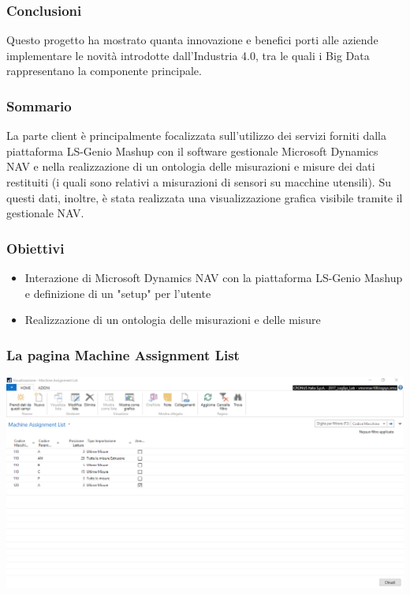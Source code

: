 \documentclass{beamer}
\begin{document}
\begin{frame}
	\frametitle{Conclusioni}
	Questo progetto ha mostrato quanta innovazione e benefici porti alle aziende implementare le novità introdotte dall’Industria 4.0, tra le quali i Big Data rappresentano la componente principale.
\end{frame}

\begin{frame}
\frametitle{Sommario}
La parte client è principalmente focalizzata sull’utilizzo dei servizi forniti dalla piattaforma LS-Genio Mashup con il software gestionale Microsoft Dynamics NAV e nella realizzazione di un ontologia delle misurazioni e misure dei dati restituiti (i quali sono relativi a misurazioni di sensori su macchine utensili). Su questi dati, inoltre, è stata realizzata una visualizzazione grafica visibile tramite il gestionale NAV.
\end{frame}

\begin{frame}
\frametitle{Obiettivi}
\begin{itemize}
	\item Interazione di Microsoft Dynamics NAV con la piattaforma LS-Genio Mashup e definizione di un "setup" per l'utente
	
	\item Realizzazione di un ontologia delle misurazioni e delle misure
\end{itemize}	
\end{frame}

\begin{frame}
\frametitle{La pagina Machine Assignment List}
\includegraphics[width=1\textwidth]{images/MachineAssignmentList2.png}
\end{frame}
\end{document}
